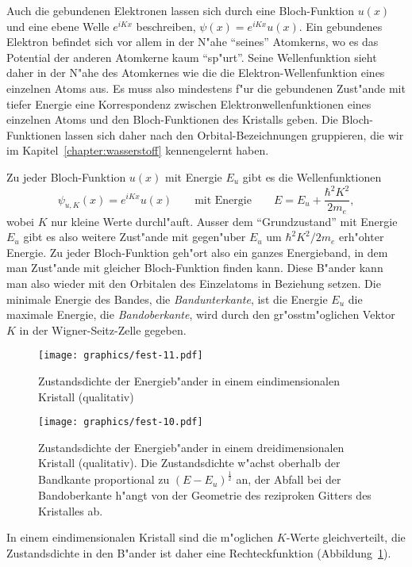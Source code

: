 Auch die gebundenen Elektronen lassen sich durch eine Bloch-Funktion $u(x)$ 
und eine ebene Welle $e^{iKx}$ beschreiben, $\psi(x)=e^{iKx}u(x)$.
Ein gebundenes Elektron befindet sich vor allem in der N"ahe ``seines''
Atomkerns, wo es das Potential der anderen Atomkerne kaum ``sp"urt''.
Seine Wellenfunktion sieht daher in der N"ahe des Atomkernes wie die die
Elektron-Wellenfunktion eines einzelnen Atoms aus.
Es muss also mindestens f"ur die gebundenen Zust"ande mit tiefer Energie
eine Korrespondenz zwischen Elektronwellenfunktionen eines einzelnen
Atoms und den Bloch-Funktionen des Kristalls geben. Die Bloch-Funktionen
lassen sich daher nach den Orbital-Bezeich\-nungen gruppieren, die wir
im Kapitel~\ref{chapter:wasserstoff} kennengelernt haben.

Zu jeder Bloch-Funktion $u(x)$ mit Energie $E_u$ gibt es die Wellenfunktionen
\[
\psi_{u,K}(x)=e^{iKx}u(x)
\qquad\text{mit Energie}\qquad
E=E_u+\frac{\hbar^2K^2}{2m_e},
\]
wobei $K$ nur kleine Werte durchl"auft.
Ausser dem ``Grundzustand'' mit Energie $E_u$ gibt es also weitere
Zust"ande mit gegen"uber $E_u$ um $\hbar^2K^2/2m_e$ erh"ohter Energie.
Zu jeder Bloch-Funktion geh"ort also ein ganzes Energieband, in dem man
Zust"ande mit gleicher Bloch-Funktion finden kann.
Diese B"ander kann man also wieder mit den Orbitalen des Einzelatoms
in Beziehung setzen.
Die minimale Energie des Bandes, die {\em Bandunterkante}, ist die Energie $E_u$
die maximale Energie, die {\em Bandoberkante}, wird durch den gr"osstm"oglichen
Vektor $K$ in der Wigner-Seitz-Zelle gegeben.
%
%

\begin{figure}
\centering
\texttt{[image: graphics/fest-11.pdf]}
\caption{Zustandsdichte der Energieb"ander in einem eindimensionalen
Kristall (qualitativ)\label{skript:zustandsdichte1d}}
\end{figure}
\begin{figure}
\centering
\texttt{[image: graphics/fest-10.pdf]}
\caption{Zustandsdichte der Energieb"ander in einem dreidimensionalen
Kristall (qualitativ). Die Zustandsdichte w"achst oberhalb der
Bandkante proportional zu $(E-E_u)^{\frac12}$ an, der Abfall bei
der Bandoberkante h"angt von der Geometrie des reziproken Gitters des
Kristalles ab.
\label{skript:zustandsdichte3d}}
\end{figure}

In einem eindimensionalen Kristall sind die m"oglichen $K$-Werte
gleichverteilt, die Zustandsdichte in den B"ander ist daher eine
Rechteckfunktion (Abbildung~\ref{skript:zustandsdichte1d}).

